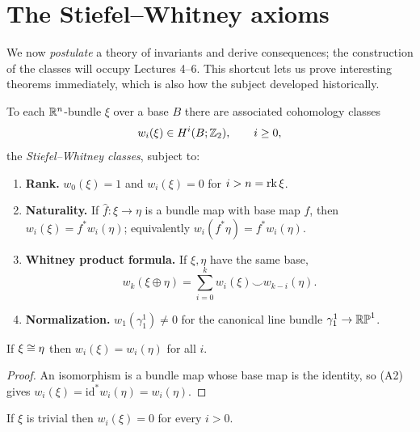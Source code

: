 \section{The Stiefel--Whitney axioms}

We now \emph{postulate} a theory of invariants and derive consequences; the
construction of the classes will occupy Lectures 4--6. This shortcut lets us
prove interesting theorems immediately, which is also how the subject developed
historically.

\begin{definition}[Axioms]\label{def:sw-axioms}
To each $\mathbb{R}^n$-bundle $\xi$ over a base $B$ there are associated cohomology
classes
\[
w_i(\xi)\in H^i(B;\mathbb{Z}_2),\qquad i\ge0,
\]
the \emph{Stiefel--Whitney classes}, subject to:

\begin{enumerate}
\item[(A1)] \textbf{Rank.} $w_0(\xi)=1$ and $w_i(\xi)=0$ for $i>n=\operatorname{rk}\xi$.

\item[(A2)] \textbf{Naturality.} If $\hat f\colon\xi\to\eta$ is a bundle map
with base map $f$, then $w_i(\xi)=f^*w_i(\eta)$; equivalently
$w_i(f^*\eta)=f^*w_i(\eta)$.

\item[(A3)] \textbf{Whitney product formula.} If $\xi,\eta$ have the same base,
\[
w_k(\xi\oplus\eta)=\sum_{i=0}^{k}w_i(\xi)\smile w_{k-i}(\eta).
\]

\item[(A4)] \textbf{Normalization.} $w_1(\gamma^1_1)\neq0$ for the canonical
line bundle $\gamma^1_1\to\mathbb{RP}^1$.
\end{enumerate}
\end{definition}

\begin{proposition}
If $\xi\cong\eta$ then $w_i(\xi)=w_i(\eta)$ for all $i$.
\end{proposition}

\begin{proof}
An isomorphism is a bundle map whose base map is the identity, so (A2) gives
$w_i(\xi)=\mathrm{id}^*w_i(\eta)=w_i(\eta)$.
\end{proof}

\begin{proposition}\label{prop:trivial-vanishes}
If $\xi$ is trivial then $w_i(\xi)=0$ for every $i>0$.
\end{proposition}


